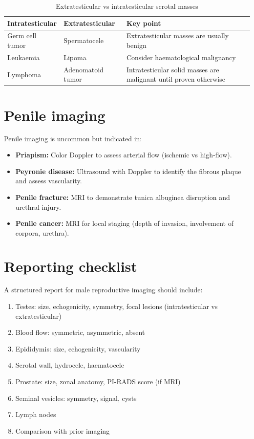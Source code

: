 \begin{table}[h]
\centering
\caption{Extratesticular vs intratesticular scrotal masses}
\label{tab:scrotal_masses}
\begin{tabular}{@{}p{}p{}p{}@{}}
\hline
\textbf{Intratesticular} & \textbf{Extratesticular} & \textbf{Key point} \\
\hline
Germ cell tumor & Spermatocele & Extratesticular masses are usually benign \\
Leukaemia & Lipoma & Consider haematological malignancy \\
Lymphoma & Adenomatoid tumor & Intratesticular solid masses are malignant until proven otherwise \\
\hline
\end{tabular}
\end{table}

\section{Penile imaging}
Penile imaging is uncommon but indicated in:
\begin{itemize}
    \item \textbf{Priapism:} Color Doppler to assess arterial flow (ischemic vs high-flow).
    \item \textbf{Peyronie disease:} Ultrasound with Doppler to identify the fibrous plaque and assess vascularity.
    \item \textbf{Penile fracture:} MRI to demonstrate tunica albuginea disruption and urethral injury.
    \item \textbf{Penile cancer:} MRI for local staging (depth of invasion, involvement of corpora, urethra).
\end{itemize}

\section{Reporting checklist}
A structured report for male reproductive imaging should include:
\begin{enumerate}
    \item Testes: size, echogenicity, symmetry, focal lesions (intratesticular vs extratesticular)
    \item Blood flow: symmetric, asymmetric, absent
    \item Epididymis: size, echogenicity, vascularity
    \item Scrotal wall, hydrocele, haematocele
    \item Prostate: size, zonal anatomy, PI-RADS score (if MRI)
    \item Seminal vesicles: symmetry, signal, cysts
    \item Lymph nodes
    \item Comparison with prior imaging
\end{enumerate}

\clearpage
